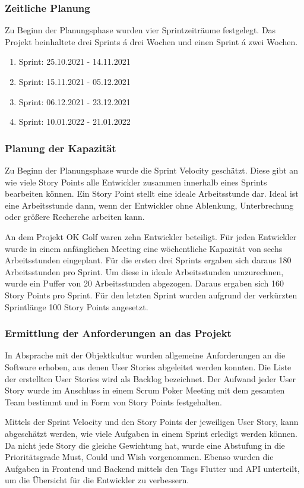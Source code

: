 \subsubsection{Zeitliche Planung}
Zu Beginn der Planungsphase wurden vier Sprintzeiträume festgelegt. Das Projekt beinhaltete drei Sprints á drei Wochen und einen Sprint á zwei Wochen. 
\begin{enumerate}
\item Sprint: 25.10.2021 - 14.11.2021
\item Sprint: 15.11.2021 - 05.12.2021
\item Sprint: 06.12.2021 - 23.12.2021
\item Sprint: 10.01.2022 - 21.01.2022
\end{enumerate}

\subsubsection{Planung der Kapazität}
Zu Beginn der Planungsphase wurde die Sprint Velocity geschätzt. Diese gibt an wie viele Story Points alle Entwickler zusammen innerhalb eines Sprints bearbeiten können. Ein Story Point stellt eine ideale Arbeitsstunde dar. Ideal ist eine Arbeitsstunde dann, wenn der Entwickler ohne Ablenkung, Unterbrechung oder größere Recherche arbeiten kann.

An dem Projekt OK Golf waren zehn Entwickler beteiligt. Für jeden Entwickler wurde in einem anfänglichen Meeting eine wöchentliche Kapazität von sechs Arbeitsstunden eingeplant. 
Für die ersten drei Sprints ergaben sich daraus 180 Arbeitsstunden pro Sprint. Um diese in ideale Arbeitsstunden umzurechnen, wurde ein Puffer von 20 Arbeitsstunden abgezogen. Daraus ergaben sich 160 Story Points pro Sprint.
Für den letzten Sprint wurden aufgrund der verkürzten Sprintlänge 100 Story Points angesetzt.

\subsubsection{Ermittlung der Anforderungen an das Projekt}
In Absprache mit der Objektkultur wurden allgemeine Anforderungen an die Software erhoben, aus denen User Stories abgeleitet werden konnten. Die Liste der erstellten User Stories wird als Backlog bezeichnet. Der Aufwand jeder User Story wurde im Anschluss in einem Scrum Poker Meeting mit dem gesamten Team bestimmt und in Form von Story Points festgehalten. 

Mittels der Sprint Velocity und den Story Points der jeweiligen User Story, kann abgeschätzt werden, wie viele Aufgaben in einem Sprint erledigt werden können. Da nicht jede Story die gleiche Gewichtung hat, wurde eine Abstufung in die Prioritätsgrade \glqq Must\grqq{}, \glqq Could\grqq{} und \glqq Wish\grqq{} vorgenommen. Ebenso wurden die Aufgaben in Frontend und Backend mittels den Tags \glqq Flutter\grqq{} und \glqq API\grqq{} unterteilt, um die Übersicht für die Entwickler zu verbessern.

